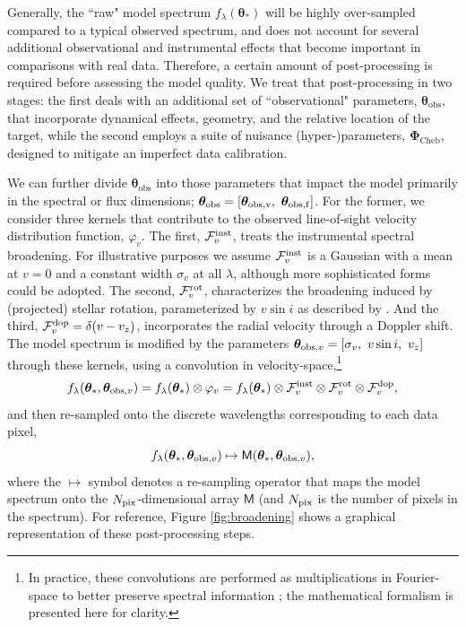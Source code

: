 \documentclass[iop,floatfix]{emulateapj}
\newcommand{\vt}{ {\bm \theta}}
\newcommand{\vM}{\mathsf{M}}
\newcommand{\flam}{f_\lambda}
\newcommand{\vt}{ {\bm \theta}}
\newcommand{\vP}{ {\bm \Phi}}
\newcommand{\fundamentalParameters}{\vt_{\ast}}
\newcommand{\observationalParameters}{\vt_{\textrm{obs}}}
\newcommand{\Cheb}{ \vP_{\textrm{Cheb}}}
\begin{document}
Generally, the ``raw" model spectrum $\flam(\fundamentalParameters)$ will be highly over-sampled compared 
to a typical observed spectrum, and does not account for several additional observational and 
instrumental effects that become important in comparisons with real data.  Therefore, a certain 
amount of post-processing is required before assessing the model quality.  We treat that 
post-processing in two stages: the first deals with an additional set of ``observational" 
parameters, $\observationalParameters$, that incorporate dynamical effects, geometry, and the relative 
location of the target, while the second employs a suite of nuisance (hyper-)parameters, $\Cheb$, designed to mitigate an imperfect data calibration.

We can further divide $\observationalParameters$ into those parameters that impact the model primarily in the 
spectral or flux dimensions; $\observationalParameters = [\vt_{\rm obs, v}, \,\, \vt_{\rm obs, f}]$.  For the 
former, we consider three kernels that contribute to the observed line-of-sight velocity 
distribution function, $\varphi_v$.  The first, $\mathcal{F}_v^{\rm inst}$, treats the instrumental 
spectral broadening.  For illustrative purposes we assume $\mathcal{F}_v^{\rm inst}$ is a Gaussian 
with a mean at $v = 0$ and a constant width $\sigma_v$ at all $\lambda$, although more 
sophisticated forms could be adopted.  The second, $\mathcal{F}_v^{\rm rot}$, characterizes the 
broadening induced by (projected) stellar rotation, parameterized by $v\sin{i}$ as described by 
\citet[][his Eq.~18.14]{gray08}.  And the third, $\mathcal{F}_v^{\rm dop} = \delta(v-v_z)$, 
incorporates the radial velocity through a Doppler shift.  The model spectrum is modified by the 
parameters $\vt_{{\rm obs}, v} = [\sigma_v, \,\, v\sin{i}, \,\, v_z]$ through these kernels, using 
a convolution in velocity-space,\footnote{In practice, these convolutions are performed as 
multiplications in Fourier-space to better preserve spectral information \citep[cf.,][]{tonry79}; 
the mathematical formalism is presented here for clarity.}
\begin{equation}
\flam(\fundamentalParameters, \vt_{{\rm obs}, v}) = \flam(\fundamentalParameters) \otimes \varphi_v = \flam(\fundamentalParameters) \otimes \mathcal{F}_v^{\rm inst} \otimes \mathcal{F}_v^{\rm rot} \otimes \mathcal{F}_v^{\rm dop},
\label{eqn:broadening}
\end{equation}
and then re-sampled onto the discrete wavelengths corresponding to each data pixel, 
\begin{equation}
\flam(\fundamentalParameters, \vt_{{\rm obs}, v}) \mapsto \vM(\fundamentalParameters, \vt_{{\rm obs}, v}),
\label{eqn:resampling}
\end{equation}
where the $\mapsto$ symbol denotes a re-sampling operator that maps the model spectrum onto the 
$N_{\rm pix}$-dimensional array $\vM$ (and $N_{\rm pix}$ is the number of pixels in the spectrum).  
For reference, Figure \ref{fig:broadening} shows a graphical representation of these 
post-processing steps.
\end{document}

